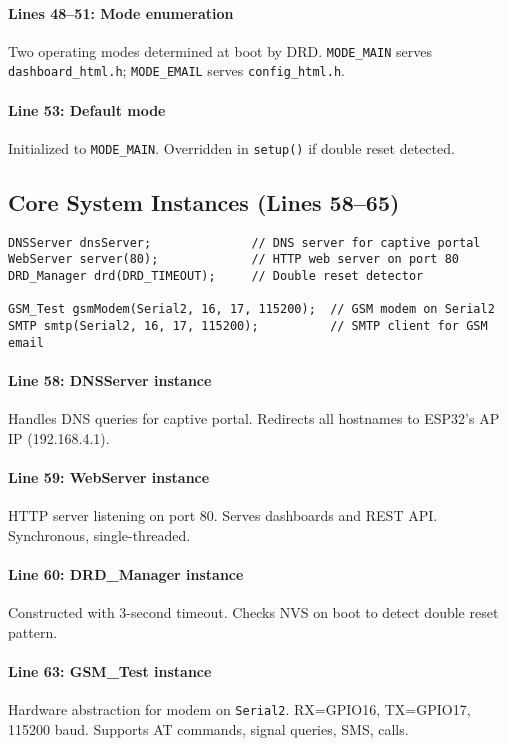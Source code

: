 \documentclass[11pt,a4paper]{article}
\begin{document}
\paragraph{Lines 48--51: Mode enumeration}
Two operating modes determined at boot by DRD. \texttt{MODE\_MAIN} serves \texttt{dashboard\_html.h}; \texttt{MODE\_EMAIL} serves \texttt{config\_html.h}.

\paragraph{Line 53: Default mode}
Initialized to \texttt{MODE\_MAIN}. Overridden in \texttt{setup()} if double reset detected.

\subsection{Core System Instances (Lines 58--65)}

\begin{verbatim}
DNSServer dnsServer;              // DNS server for captive portal
WebServer server(80);             // HTTP web server on port 80
DRD_Manager drd(DRD_TIMEOUT);     // Double reset detector

GSM_Test gsmModem(Serial2, 16, 17, 115200);  // GSM modem on Serial2
SMTP smtp(Serial2, 16, 17, 115200);          // SMTP client for GSM email
\end{verbatim}

\paragraph{Line 58: DNSServer instance}
Handles DNS queries for captive portal. Redirects all hostnames to ESP32's AP IP (192.168.4.1).

\paragraph{Line 59: WebServer instance}
HTTP server listening on port 80. Serves dashboards and REST API. Synchronous, single-threaded.

\paragraph{Line 60: DRD\_Manager instance}
Constructed with 3-second timeout. Checks NVS on boot to detect double reset pattern.

\paragraph{Line 63: GSM\_Test instance}
Hardware abstraction for modem on \texttt{Serial2}. RX=GPIO16, TX=GPIO17, 115200 baud. Supports AT commands, signal queries, SMS, calls.
\end{document}

